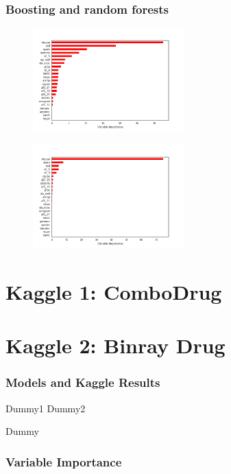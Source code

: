 \documentclass{beamer}
\begin{document}
\begin{frame}
\frametitle{Boosting and random forests}
\begin{figure}
\centering
\begin{minipage}{.5\textwidth}
  \centering
  \includegraphics[width=.8\linewidth,height=4cm]{crime_boosttu}
  \label{fig:test1}
\end{minipage}%
\begin{minipage}{.5\textwidth}
  \centering
  \includegraphics[width=.8\linewidth,height=4cm]{crime_randtu}
  \label{fig:test2}
\end{minipage}
\end{figure}
\end{frame}

\section{Kaggle 1:  ComboDrug}


\section{Kaggle 2: Binray Drug}
\begin{frame}
\frametitle{Models and Kaggle Results}
Dummy1
\pause
Dummy2
\end{frame}

\begin{frame}
Dummy
\frametitle{Variable Importance}
\end{frame}
\end{document}

